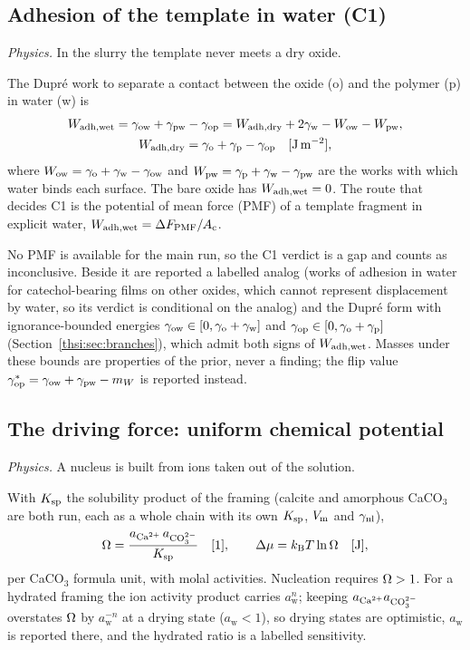 \subsection{Adhesion of the template in water (C1)}\label{thsi:sec:adhesion}

\textit{Physics.} In the slurry the template never meets a dry oxide.

The Dupr\'e work to separate a contact between the oxide (o) and the polymer (p) in water (w) is
\begin{equation}\label{thsi:eq:dupre}
\begin{gathered}
W_\mathrm{adh,wet}=\gamma_\mathrm{ow}+\gamma_\mathrm{pw}-\gamma_\mathrm{op}=W_\mathrm{adh,dry}+2\gamma_\mathrm{w}-W_\mathrm{ow}-W_\mathrm{pw},\\
W_\mathrm{adh,dry}=\gamma_\mathrm{o}+\gamma_\mathrm{p}-\gamma_\mathrm{op} \quad[\mathrm{J\,m^{-2}}],
\end{gathered}
\end{equation}
where $W_\mathrm{ow}=\gamma_\mathrm{o}+\gamma_\mathrm{w}-\gamma_\mathrm{ow}$ and $W_\mathrm{pw}=\gamma_\mathrm{p}+\gamma_\mathrm{w}-\gamma_\mathrm{pw}$ are the works with which water
binds each surface. The bare oxide has $W_\mathrm{adh,wet}=0$. The route that decides C1 is the potential of mean
force (PMF) of a template fragment in explicit water, $W_\mathrm{adh,wet}=\Delta F_\mathrm{PMF}/A_\mathrm{c}$.

No PMF is available for the main run, so the C1 verdict is a gap and counts as inconclusive. Beside it
are reported a labelled analog (works of adhesion in water for catechol-bearing films on other oxides,
which cannot represent displacement by water, so its verdict is conditional on the analog) and the
Dupr\'e form with ignorance-bounded energies $\gamma_\mathrm{ow}\in[0,\gamma_\mathrm{o}+\gamma_\mathrm{w}]$ and $\gamma_\mathrm{op}\in[0,\gamma_\mathrm{o}+\gamma_\mathrm{p}]$
(Section~\ref{thsi:sec:branches}), which admit both signs of $W_\mathrm{adh,wet}$. Masses under these bounds are
properties of the prior, never a finding; the flip value $\gamma_\mathrm{op}^{*}=\gamma_\mathrm{ow}+\gamma_\mathrm{pw}-m_W$ is reported instead.

\subsection{The driving force: uniform chemical potential}\label{thsi:sec:uniform}

\textit{Physics.} A nucleus is built from ions taken out of the solution.

With $K_\mathrm{sp}$ the solubility product of the framing (calcite and amorphous CaCO$_3$ are both run, each
as a whole chain with its own $K_\mathrm{sp}$, $V_\mathrm{m}$ and $\gamma_\mathrm{nl}$),
\begin{equation}\label{thsi:eq:omega}
\Omega=\frac{a_{\mathrm{Ca}^{2+}}\,a_{\mathrm{CO}_3^{2-}}}{K_\mathrm{sp}} \quad[\mathrm{1}],\qquad \Delta\mu=k_\mathrm{B} T\ln\Omega \quad[\mathrm{J}],
\end{equation}
per CaCO$_3$ formula unit, with molal activities. Nucleation requires $\Omega>1$. For a hydrated framing
the ion activity product carries $a_\mathrm{w}^{n}$; keeping $a_{\mathrm{Ca}^{2+}}a_{\mathrm{CO}_3^{2-}}$ overstates $\Omega$ by
$a_\mathrm{w}^{-n}$ at a drying state ($a_\mathrm{w}<1$), so drying states are optimistic, $a_\mathrm{w}$
is reported there, and the hydrated ratio is a labelled sensitivity.

